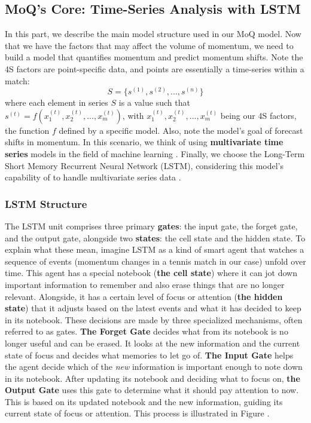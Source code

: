 \documentclass[12pt]{article}  %
\begin{document}
\subsection{MoQ's Core: Time-Series Analysis with LSTM}
In this part, we describe the main model structure used in our MoQ model. Now that we have the factors that may affect the volume of momentum, we need to build a model that quantifies momentum and predict momentum shifts. Note the 4S factors are point-specific data, and points are essentially a time-series within a match:
\[ 
	S = \{s^{(1)}, s^{(2)}, ..., s^{(n)}\}
\]
where each element in series $S$ is a value such that $s^{(t)}={f(x_1^{(t)}, x_2^{(t)}, ..., x_m^{(t)})}$, with $x_1^{(t)}, x_2^{(t)}, ..., x_m^{(t)}$ being our 4S factors, the function $f$ defined by a specific model. Also, note the model's goal of forecast shifts in momentum. In this scenario, we think of using \textbf{multivariate time series} models in the field of machine learning \cite{10}. Finally, we choose the Long-Term Short Memory Recurrent Neural Network (LSTM), considering this model's capability of to handle multivariate series data \cite{11}.
\subsubsection{LSTM Structure}

The LSTM unit comprises three primary \textbf{gates}: the input gate, the forget gate, and the output gate, alongside two \textbf{states}: the cell state and the hidden state. To explain what these mean, imagine LSTM as a kind of smart agent that watches a sequence of events (momentum changes in a tennis match in our case) unfold over time. This agent has a special notebook (\textbf{the cell state}) where it can jot down important information to remember and also erase things that are no longer relevant. Alongside, it has a certain level of focus or attention (\textbf{the hidden state}) that it adjusts based on the latest events and what it has decided to keep in its notebook. These decisions are made by three specialized mechanisms, often referred to as gates. \textbf{The Forget Gate} decides what from its notebook is no longer useful and can be erased. It looks at the new information and the current state of focus and decides what memories to let go of. \textbf{The Input Gate} helps the agent decide which of the \textit{new} information is important enough to note down in its notebook. After updating its notebook and deciding what to focus on, \textbf{the Output Gate} uses this gate to determine what it should pay attention to now. This is based on its updated notebook and the new information, guiding its current state of focus or attention. This process is illustrated in Figure .
\end{document}
